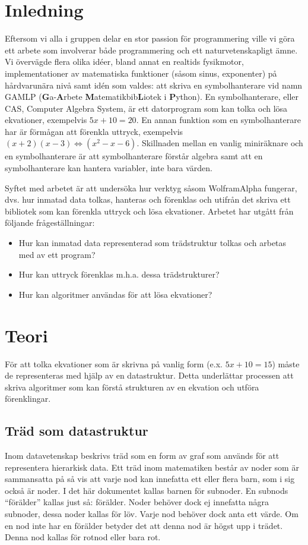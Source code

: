 \documentclass[12pt,a4paper]{article}
\begin{document}
\section{Inledning}
Eftersom vi alla i gruppen delar en stor passion för programmering ville vi göra ett arbete som involverar både programmering och ett naturvetenskapligt ämne. Vi övervägde flera olika idéer, bland annat en realtids fysikmotor, implementationer av matematiska funktioner (såsom sinus, exponenter) på hårdvarunära nivå samt idén som valdes: att skriva en symbolhanterare vid namn GAMLP (\textbf{G}a-\textbf{A}rbete \textbf{M}atematikbib\textbf{L}iotek i \textbf{P}ython). En symbolhanterare, eller CAS, Computer Algebra System, är ett datorprogram som kan tolka och lösa ekvationer, exempelvis \(5x + 10 = 20\). En annan funktion som en symbolhanterare har är förmågan att förenkla uttryck, exempelvis \((x + 2)(x - 3) \Leftrightarrow (x^{2} - x - 6)\). Skillnaden mellan en vanlig miniräknare och en symbolhanterare är att symbolhanterare förstår algebra samt att en symbolhanterare kan hantera variabler, inte bara värden. 
\par
Syftet med arbetet är att undersöka hur verktyg såsom WolframAlpha fungerar, dvs. hur inmatad data tolkas, hanteras och förenklas och utifrån det skriva ett bibliotek som kan förenkla uttryck och lösa ekvationer. Arbetet har utgått från följande frågeställningar:
\begin{itemize}
	\item Hur kan inmatad data representerad som trädstruktur tolkas och arbetas med av ett program?
	\item Hur kan uttryck förenklas m.h.a. dessa trädstrukturer?
	\item Hur kan algoritmer användas för att lösa ekvationer?
\end{itemize}
\section{Teori}
För att tolka ekvationer som är skrivna på vanlig form (e.x. \(5x + 10 = 15\)) måste de representeras med hjälp av en datastruktur. Detta underlättar processen att skriva algoritmer som kan förstå strukturen av en ekvation och utföra förenklingar.
\subsection{Träd som datastruktur}
\label{subsec:trees}
Inom datavetenskap beskrivs träd som en form av graf som används för att representera hierarkisk data. Ett träd inom matematiken består av noder som är sammansatta på så vis att varje nod kan innefatta ett eller flera barn, som i sig också är noder. I det här dokumentet kallas barnen för subnoder. En subnods ``förälder'' kallas just så: förälder. Noder behöver dock ej innefatta några subnoder, dessa noder kallas för löv. Varje nod behöver dock anta ett värde. Om en nod inte har en förälder betyder det att denna nod är högst upp i trädet. Denna nod kallas för rotnod eller bara rot.
\end{document}
